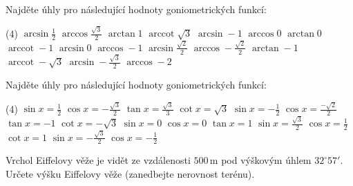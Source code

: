 \documentclass[12pt,a4paper]{article}
\DeclareMathOperator{\arccot}{arccot}
\begin{document}
\begin{exercise}
    Najděte úhly pro následující hodnoty goniometrických funkcí:
    \begin{tasks}(4)
        \task $\arcsin \frac{1}{2} $
        \task $\arccos \frac{\sqrt{3}}{2} $
        \task $\arctan 1 $
        \task $\arccot \sqrt{3} $
        \task $\arcsin -1 $
        \task $\arccos 0 $ 
        \task $\arctan 0 $
        \task $\arccot -1 $
        \task $\arcsin 0 $
        \task $\arccos -1 $
        \task $\arcsin \frac{\sqrt{2}}{2} $
        \task $\arccos -\frac{\sqrt{2}}{2} $
        \task $\arctan -1 $
        \task $\arccot -\sqrt{3} $
        \task $\arcsin -\frac{\sqrt{3}}{2} $
        \task $\arccos -2 $
    \end{tasks}
\end{exercise}


\begin{exercise}
    Najděte úhly pro následující hodnoty goniometrických funkcí:
    \begin{tasks}(4)
        \task $\sin x = \frac{1}{2} $
        \task $\cos x = -\frac{\sqrt{3}}{2} $
        \task $\tan x = \frac{\sqrt{3}}{3} $
        \task $\cot x = \sqrt{3} $
        \task $\sin x = -\frac{1}{2} $
        \task $\cos x = \frac{-\sqrt{2}}{2} $
        \task $\tan x = -1 $
        \task $\cot x = -\sqrt{3} $
        \task $\sin x = 0 $
        \task $\cos x = 0 $
        \task $\tan x = 1 $
        \task $\sin x = \frac{\sqrt{3}}{2} $
        \task $\cos x = \frac{1}{2} $
        \task $\cot x = 1 $
        \task $\sin x = -\frac{\sqrt{3}}{2} $
        \task $\cos x = -\frac{1}{2} $
    \end{tasks}
\end{exercise}


\setcounter{section}{2}
\begin{exercise}
    Vrchol Eiffelovy věže je vidět ze vzdálenosti $500\,\text{m}$ pod výškovým úhlem 
    $32^\circ 57'$. Určete výšku Eiffelovy věže (zanedbejte nerovnost terénu).
\end{exercise}
\end{document}
